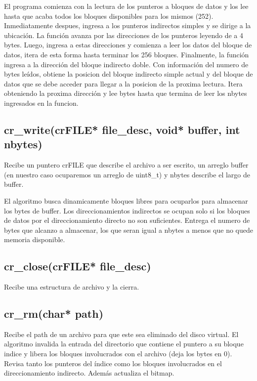 \documentclass[12pt]{article}
\begin{document}
El programa comienza con la lectura de los punteros a bloques de datos y los lee hasta que acaba todos los bloques disponibles para los mismos (252). Inmediatamente despues, ingresa a los punteros indirectos simples y se dirige a la ubicación. La función avanza por las direcciones de los punteros leyendo de a 4 bytes. Luego, ingresa a estas direcciones y comienza a leer los datos del bloque de datos, itera de esta forma hasta terminar los 256 bloques. Finalmente, la función ingresa a la dirección del bloque indirecto doble. Con información del numero de bytes leídos, obtiene la posicion del bloque indirecto simple actual y del bloque de datos que se debe acceder para llegar a la posicion de la proxima lectura. Itera obteniendo la proxima dirección y lee bytes hasta que termina de leer los nbytes ingresados en la funcion.


\subsection{cr\_write(crFILE* file\_desc, void* buffer, int nbytes)}
Recibe un puntero crFILE que describe el archivo a ser escrito, un arreglo buffer (en nuestro caso ocuparemos un arreglo de uint8\_t) y nbytes describe el largo de buffer.

El algoritmo busca dinamicamente bloques libres para ocuparlos para almacenar los bytes de buffer. Los direccionamientos indirectos se ocupan solo si los bloques de datos por el direccionamiento directo no son suficientes. Entrega el numero de bytes que alcanzo a almacenar, los que seran igual a nbytes a menos que no quede memoria disponible.



\subsection{cr\_close(crFILE* file\_desc)}
Recibe una estructura de archivo y la cierra.


\subsection{cr\_rm(char* path)}
Recibe el path de un archivo para que este sea eliminado del disco virtual. El algoritmo invalida la entrada del directorio que contiene el puntero a su bloque indice y libera los bloques involucrados con el archivo (deja los bytes en 0). Revisa tanto los punteros del índice como los bloques involucrados en el direccionamiento indirecto. Además actualiza el bitmap.
\end{document}
